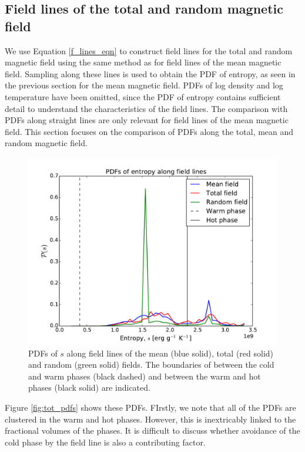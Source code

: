 \documentclass[useAMS,usenatbib]{mn2e}
\begin{document}
\subsection{Field lines of the total and random magnetic field}
We use Equation \eqref{f_lines_eqn} to construct field lines for the total and random magnetic field using the same method as for field lines of the mean magnetic field. Sampling along these lines is used to obtain the PDF of  entropy, as seen in the previous section for the mean magnetic field. PDFs of log density and log temperature have been omitted, since the PDF of entropy contains sufficient detail to understand the characteristics of the field lines. The comparison with PDFs along straight lines are only relevant for field lines of the mean magnetic field. This section focuses on the comparison of PDFs along the total, mean and random magnetic field. 
\begin{figure}
\includegraphics[width=\linewidth]{decomp_pdf_overall.pdf}
\caption{PDFs of $s$ along field lines of the mean (blue solid), total (red solid) and random (green solid) fields. The boundaries of between the cold and warm phases (black dashed) and between the warm and hot phases (black solid) are indicated.}
\label{fig:tot_pdfs}
\end{figure}
Figure \vref{fig:tot_pdfs} shows these PDFs. FIrstly, we note that all of the PDFs are clustered in the warm and hot phases. However, this is inextricably linked to the fractional volumes of the phases. It is difficult to discuss whether avoidance of the cold phase by the field line is also a contributing factor.\\
\end{document}
